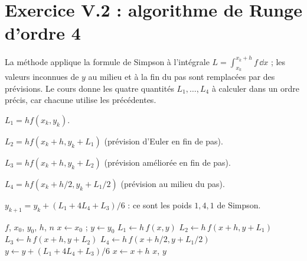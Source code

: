 \section{Exercice V.2 : algorithme de Runge d'ordre 4}


\Pourquoi La méthode applique la formule de Simpson à l'intégrale
$L = \int_{x_k}^{x_k+h} f\,\dd x$ ; les valeurs inconnues de $y$ au milieu et
à la fin du pas sont remplacées par des prévisions. Le cours donne les quatre
quantités $L_1, \dots, L_4$ à calculer dans un ordre précis, car chacune
utilise les précédentes.

\Etapes
{} $L_1 = hf(x_k, y_k)$.

 $L_2 = hf(x_k + h, y_k + L_1)$ (prévision d'Euler en fin de pas).

 $L_3 = hf(x_k + h, y_k + L_2)$ (prévision améliorée en fin de pas).

 $L_4 = hf(x_k + h/2, y_k + L_1/2)$ (prévision au milieu du pas).

 $y_{k+1} = y_k + (L_1 + 4L_4 + L_3)/6$ : ce sont les poids
$1, 4, 1$ de Simpson.

\begin{algo}
  \Require $f$, $x_0$, $y_0$, $h$, $n$
  \State $x \leftarrow x_0$ ; $y \leftarrow y_0$
    \State $L_1 \leftarrow h\,f(x, y)$
    \State $L_2 \leftarrow h\,f(x + h, y + L_1)$
    \State $L_3 \leftarrow h\,f(x + h, y + L_2)$
    \State $L_4 \leftarrow h\,f(x + h/2, y + L_1/2)$
    \State $y \leftarrow y + (L_1 + 4L_4 + L_3)/6$
    \State $x \leftarrow x + h$
    \Print $x$, $y$
  \EndFor
\end{algo}

